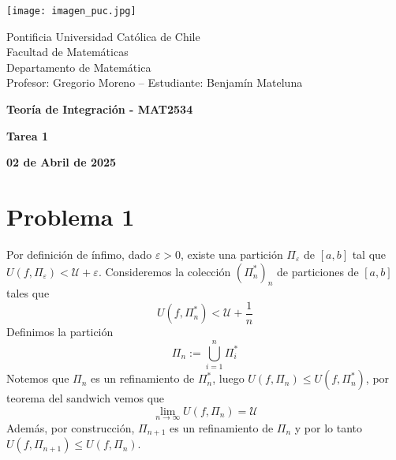 \documentclass{article}
\begin{document}
\begin{minipage}{2.5cm}
    \texttt{[image: imagen\_puc.jpg]}
\end{minipage}
\begin{minipage}{14cm}
    {\sc Pontificia Universidad Católica de Chile\\
    Facultad de Matemáticas\\
    Departamento de Matemática\\
    Profesor: Gregorio Moreno -- Estudiante: Benjamín Mateluna}
\end{minipage}
\vspace{1ex}

{\centerline{\bf Teoría de Integración - MAT2534}
\centerline{\bf Tarea 1}}
\centerline{\bf 02 de Abril de 2025}

\section*{Problema 1}
\noindent Por definición de ínfimo, dado $\varepsilon>0$, existe una partición $\Pi_{\varepsilon}$ 
de $[a,b]$ tal que $U(f,\Pi_{\varepsilon})<\mathcal{U}+\varepsilon$. Consideremos la colección
$\left(\Pi^{*}_{n}\right)_{n}$ de particiones de $[a,b]$ tales que
\begin{equation*}
    U(f,\Pi^{*}_{n})<\mathcal{U}+\frac{1}{n}
\end{equation*}
Definimos la partición
\begin{equation*}
    \Pi_{n}:=\bigcup_{i=1}^{n}\Pi^{*}_{i}
\end{equation*}
Notemos que $\Pi_{n}$ es un refinamiento de $\Pi^{*}_{n}$, luego $U(f,\Pi_{n})\leq 
U(f,\Pi^{*}_{n})$, por teorema del sandwich vemos que
\begin{equation*}
    \lim_{n\to\infty}U(f,\Pi_{n})=\mathcal{U}
\end{equation*}
Además, por construcción, $\Pi_{n+1}$ es un refinamiento de $\Pi_{n}$ y por lo tanto 
$U(f,\Pi_{n+1})\leq U(f,\Pi_{n})$.
\end{document}
